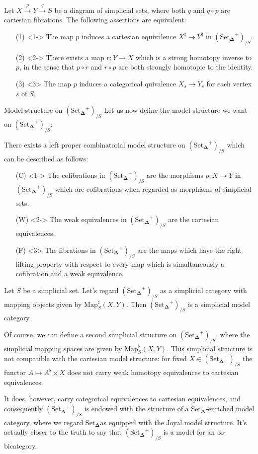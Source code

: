 \documentclass{beamer}[9pt]
\newcommand{\8}{\ensuremath{\infty}}
\newcommand{\SSet}{\ensuremath{\text{Set}_{\boldsymbol{\Delta}}}}
\newcommand{\Map}{\ensuremath{\text{Map}}}
\begin{document}
\begin{frame}
  Let $X \xrightarrow{p} Y \xrightarrow{q} S$ be a diagram of simplicial sets, where both $q$ and $q\circ p$ are cartesian fibrations. The following assertions are equivalent:

  \begin{itemize}
    \item[(1)]<1-> The map $p$ induces a cartesian equivalence $X^\natural \rightarrow Y^\natural$ in $(\SSet^+)_{/S}$.
    \item[(2)]<2-> There exists a map $r: Y \rightarrow X$ which is a strong homotopy inverse to $p$, in the sense that $p\circ r$ and $r\circ p$ are both strongly homotopic to the identity.
    \item[(3)]<3> The map $p$ induces a categorical quivalence $X_s \rightarrow Y_s$ for each vertex $s$ of $S$.
  \end{itemize}
\end{frame}

\begin{frame}{Model structure on $(\SSet^+)_{/S}$}
  Let us now define the model structure we want on $(\SSet^+)_{/S}$:

  There exists a left proper combinatorial model structure on $(\SSet^+)_{/S}$ which can be described as follows:
  \begin{itemize}
    \item[(C)]<1-> The cofibrations in $(\SSet^+)_{/S}$ are the morphisms $p: X \rightarrow Y$ in $(\SSet^+)_{/S}$ which are cofibrations when regarded as morphisms of simplicial sets.
    \item[(W)]<2-> The weak equivalences in $(\SSet^+)_{/S}$ are the cartesian equivalences.
    \item[(F)]<3> The fibrations in $(\SSet^+)_{/S}$ are the maps which have the right lifting property with respect to every map which is simultaneously a cofibration and a weak equivalence.
  \end{itemize}
\end{frame}

\begin{frame}
  Let $S$ be a simplicial set. Let's regard $(\SSet^+)_{/S}$ as a simplicial category with mapping objects given by $\Map^\sharp_S(X, Y)$. Then $(\SSet^+)_{/S}$ is a simplicial model category.

  \pause

  Of course, we can define a second simplicial structure on $(\SSet^+)_{/S}$, where the simplicial mapping spaces are given by $\Map^\flat_S(X, Y)$. This simplicial structure is not compatible with the cartesian model structure: for fixed $X \in (\SSet^+)_{/S}$ the functor $A\mapsto A^\flat\times X$ does not carry weak homotopy equivalences to cartesian equivalences.

  \pause

  It does, however, carry categorical equivalences to cartesian equivalences, and consequently $(\SSet^+)_{/S}$ is endowed with the structure of a \SSet-enriched model category, where we regard \SSet as equipped with the Joyal model structure. It's actually closer to the truth to say that $(\SSet^+)_{/S}$ is a model for an \8-bicategory.
\end{frame}
\end{document}
